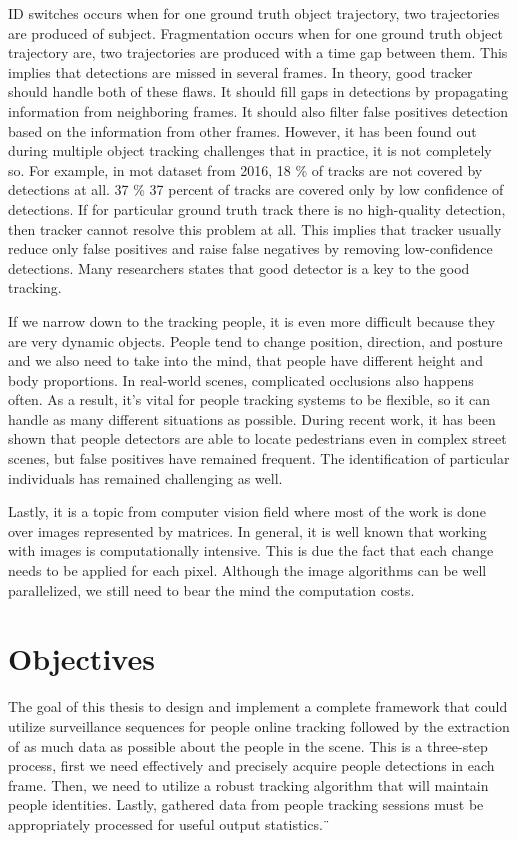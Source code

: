 \begin{introduction}
    ID switches occurs when for one ground truth object trajectory, two trajectories are produced of subject. Fragmentation occurs when for one ground truth object trajectory are, two trajectories are produced with a time gap between them. This implies that detections are missed in several frames. In theory, good tracker should handle both of these flaws. It should fill gaps in detections by propagating information from neighboring frames. It should also filter false positives detection based on the information from other frames. However, it has been found out during multiple object tracking challenges that in practice, it is not completely so. For example, in \gls{mot} dataset from 2016, 18 \% of tracks are not covered by detections at all. 37 \% 37 percent of tracks are covered only by low confidence of detections. If for particular ground truth track there is no high-quality detection, then tracker cannot resolve this problem at all. This implies that tracker usually reduce only false positives and raise false negatives by removing low-confidence detections. Many researchers states that good detector is a key to the good tracking. \cite{konushin2017}
    
    If we narrow down to the tracking people, it is even more difficult because they are very dynamic objects. People tend to change position, direction, and posture and we also need to take into the mind, that people have different height and body proportions. In real-world scenes, complicated occlusions also happens often. As a result, it’s vital for people tracking systems to be flexible, so it can handle as many different situations as possible. During recent work, it has been shown that people detectors are able to locate pedestrians even in complex street scenes, but false positives have remained frequent. The identification of particular individuals has remained challenging as well. 
    
    Lastly, it is a topic from computer vision field where most of the work is done over images represented by matrices. In general, it is well known that working with images is computationally intensive. This is due the fact that each change needs to be applied for each pixel. Although the image algorithms can be well parallelized, we still need to bear the mind the computation costs. 

\section{Objectives}
    The goal of this thesis to design and implement a complete framework that could utilize surveillance sequences for people online tracking followed by the extraction of as much data as possible about the people in the scene.
    This is a three-step process, first we need effectively and precisely acquire people detections in each frame. Then, we need to utilize a robust tracking algorithm that will maintain people identities. Lastly, gathered data from people tracking sessions must be appropriately processed for useful output statistics.¨


\end{introduction}
